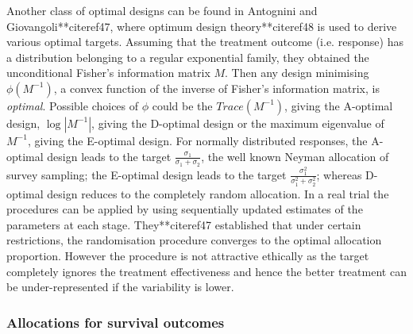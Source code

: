 Another class of optimal designs can be found in Antognini and
Giovangoli**citeref{47}, where optimum design theory**citeref{48}  is
used to derive various optimal targets. Assuming that the treatment outcome (i.e. response) has a distribution belonging to a regular exponential family, they obtained the unconditional Fisher's information matrix $M$. Then any design minimising $\phi(M^{-1})$, a convex function of the inverse of Fisher's information matrix, is \textit{optimal}. Possible choices of $\phi$ could be the $Trace(M^{-1})$, giving the A-optimal design, $\log|M^{-1}|$, giving the D-optimal design or the maximum eigenvalue of $M^{-1}$, giving
the E-optimal design. For normally distributed responses, the
A-optimal design leads to the target $\frac{\sigma_{1}}{\sigma_{1}+\sigma_{2}}$, the well known Neyman
allocation of survey sampling; the E-optimal design leads to the target
$\frac{\sigma_{1}^{2}}{\sigma_{1}^{2}+\sigma_{2}^{2}}$; whereas
D-optimal design reduces to the completely random allocation. In a real trial
the procedures can be applied by using sequentially updated estimates of the parameters at each stage. They**citeref{47} established that under certain restrictions, the randomisation procedure converges to the optimal allocation
proportion. However the procedure is not attractive ethically as the target completely ignores the treatment effectiveness and hence the better treatment can be under-represented if the variability is lower.

\subsubsection{Allocations for survival outcomes}

